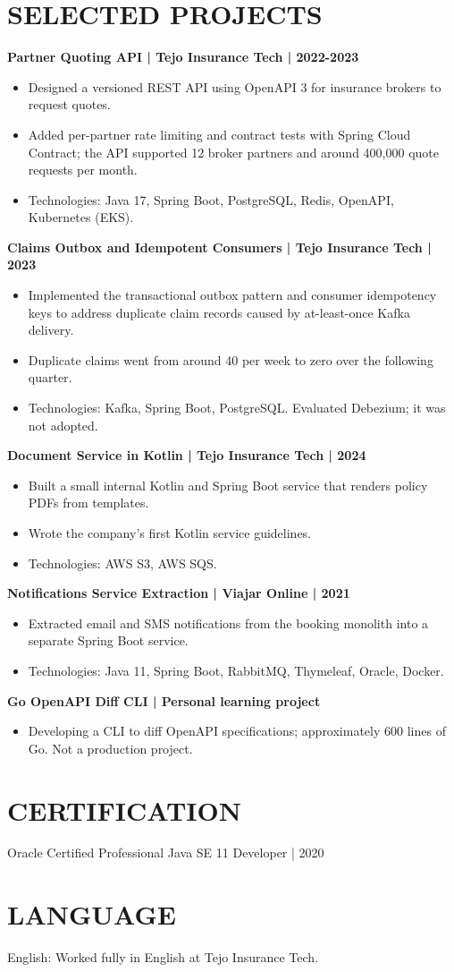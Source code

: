 \documentclass[11pt,a4paper]{article}
\begin{document}
\section*{SELECTED PROJECTS}
\textbf{Partner Quoting API | Tejo Insurance Tech | 2022-2023}
\begin{itemize}
\item Designed a versioned REST API using OpenAPI 3 for insurance brokers to request quotes.
\item Added per-partner rate limiting and contract tests with Spring Cloud Contract; the API supported 12 broker partners and around 400,000 quote requests per month.
\item Technologies: Java 17, Spring Boot, PostgreSQL, Redis, OpenAPI, Kubernetes (EKS).
\end{itemize}

\textbf{Claims Outbox and Idempotent Consumers | Tejo Insurance Tech | 2023}
\begin{itemize}
\item Implemented the transactional outbox pattern and consumer idempotency keys to address duplicate claim records caused by at-least-once Kafka delivery.
\item Duplicate claims went from around 40 per week to zero over the following quarter.
\item Technologies: Kafka, Spring Boot, PostgreSQL. Evaluated Debezium; it was not adopted.
\end{itemize}

\textbf{Document Service in Kotlin | Tejo Insurance Tech | 2024}
\begin{itemize}
\item Built a small internal Kotlin and Spring Boot service that renders policy PDFs from templates.
\item Wrote the company's first Kotlin service guidelines.
\item Technologies: AWS S3, AWS SQS.
\end{itemize}

\textbf{Notifications Service Extraction | Viajar Online | 2021}
\begin{itemize}
\item Extracted email and SMS notifications from the booking monolith into a separate Spring Boot service.
\item Technologies: Java 11, Spring Boot, RabbitMQ, Thymeleaf, Oracle, Docker.
\end{itemize}

\textbf{Go OpenAPI Diff CLI | Personal learning project}
\begin{itemize}
\item Developing a CLI to diff OpenAPI specifications; approximately 600 lines of Go. Not a production project.
\end{itemize}

\section*{CERTIFICATION}
Oracle Certified Professional Java SE 11 Developer | 2020

\section*{LANGUAGE}
English: Worked fully in English at Tejo Insurance Tech.
\end{document}
